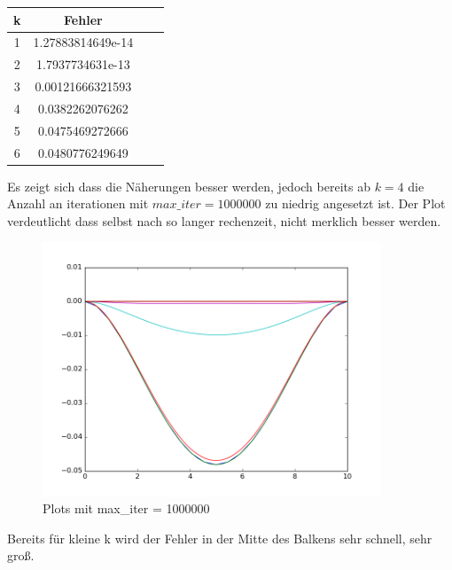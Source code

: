 \documentclass[12pt,titlepage]{article}
\begin{document}
			\begin{table}[H]
				\centering
				\begin{tabular}{c c c c}
					\bf k & \bf Fehler\\
					\hline
					1	& 1.27883814649e-14 \\ 
					2   & 1.7937734631e-13 \\
					3	& 0.00121666321593 \\
					4	& 0.0382262076262\\
					5   & 0.0475469272666\\
					6	& 0.0480776249649\\
				\end{tabular}
			\end{table}
			\newpage
			Es zeigt sich dass die Näherungen besser werden, jedoch bereits ab $k=4$ die Anzahl an iterationen mit $max\_iter=1000000$ zu niedrig angesetzt ist. Der Plot verdeutlicht dass selbst nach so langer rechenzeit, nicht merklich besser werden.	 		
		 	\begin{figure}[H] 
	 			\centering
	 			\includegraphics[width=0.9\textwidth]{one_mill.png}
	 			\caption{Plots mit max\_iter = 1000000}
	 			\label{fig:Bild3}
	 		\end{figure}
	 		
	 		Bereits für kleine k wird der Fehler in der Mitte des Balkens sehr schnell, sehr groß.
	 		
\end{document}
